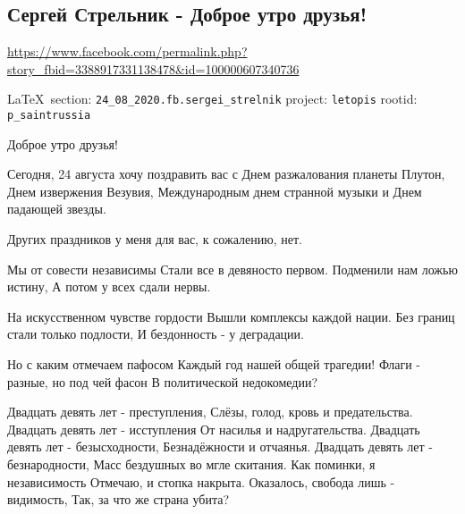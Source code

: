  
 
\subsection{Сергей Стрельник - Доброе утро друзья!}
\label{sec:24_08_2020.fb.sergei_strelnik}
\url{https://www.facebook.com/permalink.php?story_fbid=3388917331138478&id=100000607340736}
  
\vspace{0.5cm}
 {\ifDEBUG\small\LaTeX~section: \verb|24_08_2020.fb.sergei_strelnik| project: \verb|letopis| rootid: \verb|p_saintrussia| \fi}
\vspace{0.5cm}
  
Доброе утро друзья!

Сегодня, 24 августа хочу поздравить вас с Днем разжалования планеты Плутон, Днем извержения Везувия, Международным днем странной музыки и Днем падающей звезды.

Других праздников у меня для вас, к сожалению, нет.

\begin{multicols}{2}
	\obeycr
Мы от совести независимы
Стали все в девяносто первом.
Подменили нам ложью истину,
А потом у всех сдали нервы.

На искусственном чувстве гордости
Вышли комплексы каждой нации.
Без границ стали только подлости,
И бездонность - у деградации.

Но с каким отмечаем пафосом
Каждый год нашей общей трагедии!
Флаги - разные, но под чей фасон
В политической недокомедии?

Двадцать девять лет - преступления,
Слёзы, голод, кровь и предательства.
Двадцать девять лет - исступления
От насилья и надругательства.
Двадцать девять лет - безысходности,
Безнадёжности и отчаянья.
Двадцать девять лет - безнародности,
Масс бездушных во мгле скитания.
Как поминки, я независимость
Отмечаю, и стопка накрыта.
Оказалось, свобода лишь - видимость,
Так, за что же страна убита?  
	\restorecr
\end{multicols}


